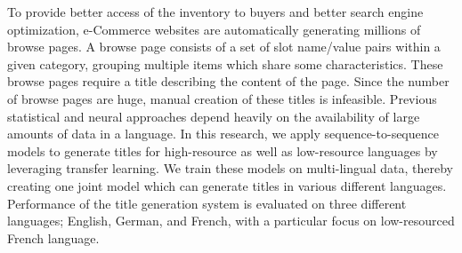To  provide  better access of the inventory to buyers and better search engine optimization, e-Commerce websites are automatically generating millions of browse pages. A browse page consists of a set of slot name/value pairs within a given category, grouping multiple items which share some characteristics. These browse pages require a title describing the content of the page. Since the number of browse pages are huge, manual  creation of these titles is infeasible. Previous statistical and neural approaches depend heavily on the availability of large amounts of data in a language. In this research, we apply sequence-to-sequence models to generate titles for high-resource as well as low-resource languages by leveraging transfer  learning. We train these models on multi-lingual data, thereby creating one joint model which can generate titles in various different languages. Performance of the title generation system is evaluated on three different languages; English, German, and French, with a particular  focus on low-resourced French language.
